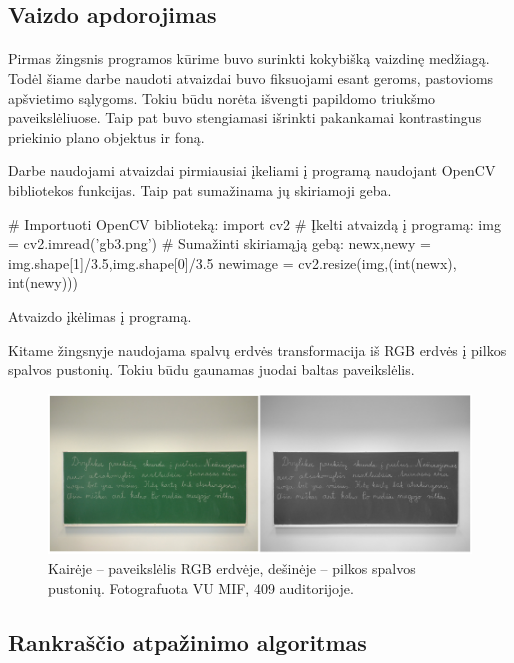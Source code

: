\documentclass[a4paper,12pt]{article}
\begin{document}
\subsection{Vaizdo apdorojimas}
 \paragraph{} Pirmas žingsnis programos kūrime buvo surinkti kokybišką vaizdinę medžiagą. Todėl šiame darbe naudoti atvaizdai buvo fiksuojami esant geroms, pastovioms apšvietimo sąlygoms. Tokiu būdu norėta išvengti papildomo triukšmo paveikslėliuose. Taip pat buvo stengiamasi išrinkti pakankamai kontrastingus priekinio plano objektus ir foną.
 
 Darbe naudojami atvaizdai pirmiausiai įkeliami į programą naudojant OpenCV bibliotekos funkcijas. Taip pat sumažinama jų skiriamoji geba.
\begin{listing}[H]
	\begin{pythoncode}
# Importuoti OpenCV biblioteką:
import cv2
# Įkelti atvaizdą į programą:
img = cv2.imread('gb3.png')
# Sumažinti skiriamąją gebą:
newx,newy = img.shape[1]/3.5,img.shape[0]/3.5
newimage = cv2.resize(img,(int(newx), int(newy)))
	\end{pythoncode}
	\caption{Atvaizdo įkėlimas į programą.}	
\end{listing}
Kitame žingsnyje naudojama spalvų erdvės transformacija iš RGB erdvės į pilkos spalvos pustonių. Tokiu būdu gaunamas juodai baltas paveikslėlis.

		\begin{figure}[H]
			\centering
			\includegraphics[scale=0.4]{images/bgr2gray}
			\caption{Kairėje – paveikslėlis RGB erdvėje, dešinėje – pilkos spalvos pustonių. Fotografuota VU MIF, 409 auditorijoje.}   %
			\label{img:bgr2gray}
		\end{figure}

\subsection{Rankraščio atpažinimo algoritmas}
\end{document}
